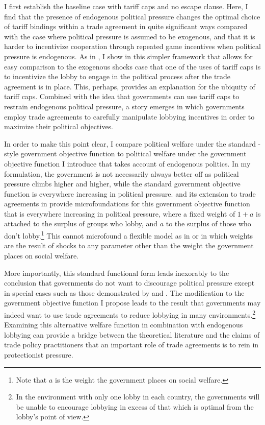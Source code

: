 I first establish the baseline case with tariff caps and no escape clause. Here, I find that the presence of endogenous political pressure changes the optimal choice of tariff bindings within a trade agreement in quite significant ways compared with the case where political pressure is assumed to be exogenous, and that it is harder to incentivize cooperation through repeated game incentives when political pressure is endogenous. As in \Textcite{mrc2007}, I show in this simpler framework that allows for easy comparison to the exogenous shocks case that one of the uses of tariff caps is to incentivize the lobby to engage in the political process after the trade agreement is in place. This, perhaps, provides an explanation for the ubiquity of tariff caps. Combined with the idea that governments can use tariff caps to restrain endogenous political pressure, a story emerges in which governments employ trade agreements to carefully manipulate lobbying incentives in order to maximize their political objectives.

In order to make this point clear, I compare political welfare under the standard \Textcite{baldwin}-style government objective function to political welfare under the government objective function I introduce that takes account of endogenous politics. In my formulation, the government is not necessarily always better off as political pressure climbs higher and higher, while the standard government objective function is everywhere increasing in political pressure. \Textcite{gh94} and its extension to trade agreements in \Textcite{gh95} provide microfoundations for this government objective function that is everywhere increasing in political pressure, where a fixed weight of $1+a$ is attached to the surplus of groups who lobby, and $a$ to the surplus of those who don't lobby.\footnote{Note that $a$ is the weight the government places on social welfare.} This cannot microfound a flexible model as in \Textcite{longvousden} or in which weights are the result of shocks to any parameter other than the weight the government places on social welfare.

More importantly, this standard functional form leads inexorably to the conclusion that governments do not want to discourage political pressure except in special cases such as those demonstrated by \Textcite{mitra} and \Textcite{mrc2007}. The modification to the government objective function I propose leads to the result that governments may indeed want to use trade agreements to reduce lobbying in many environments.\footnote{In the environment with only one lobby in each country, the governments will be unable to encourage lobbying in excess of that which is optimal from the lobby's point of view.} Examining this alternative welfare function in combination with endogenous lobbying can provide a bridge between the theoretical literature and the claims of trade policy practitioners that an important role of trade agreements is to rein in protectionist pressure.

